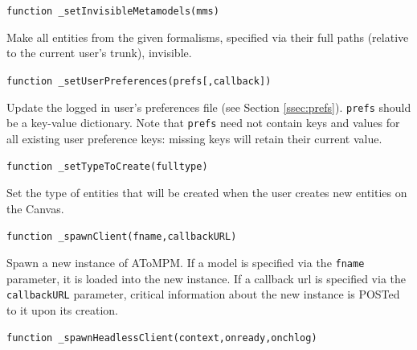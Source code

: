 \documentclass{article}
\numberwithin{equation}{section}
\numberwithin{figure}{section}
\begin{document}
\begin{center}	{\large \texttt{function \_setInvisibleMetamodels(mms)}} \end{center}

Make all entities from the given formalisms, specified via their full paths (relative to the current user's trunk), invisible.\\
\vspace*{1em}


\begin{center}	{\large \texttt{function \_setUserPreferences(prefs[,callback])}} \end{center}

Update the logged in user's preferences file (see Section \ref{ssec:prefs}). \texttt{prefs} should be a key-value dictionary. Note that \texttt{prefs} need not contain keys and values for all existing user preference keys: missing keys will retain their current value.\\
\vspace*{1em}


\begin{center}	{\large \texttt{function \_setTypeToCreate(fulltype)}} \end{center}

Set the type of entities that will be created when the user creates new entities on the Canvas.\\
\vspace*{1em}


\begin{center}	{\large \texttt{function \_spawnClient(fname,callbackURL)}} \end{center}

Spawn a new instance of AToMPM. If a model is specified via the \texttt{fname} parameter, it is loaded into the new instance. If a callback url is specified via the \texttt{callbackURL} parameter, critical information about the new instance is POSTed to it upon its creation.\\
\vspace*{1em}


\begin{center}	{\large \texttt{function \_spawnHeadlessClient(context,onready,onchlog)}} \end{center}
\end{document}
